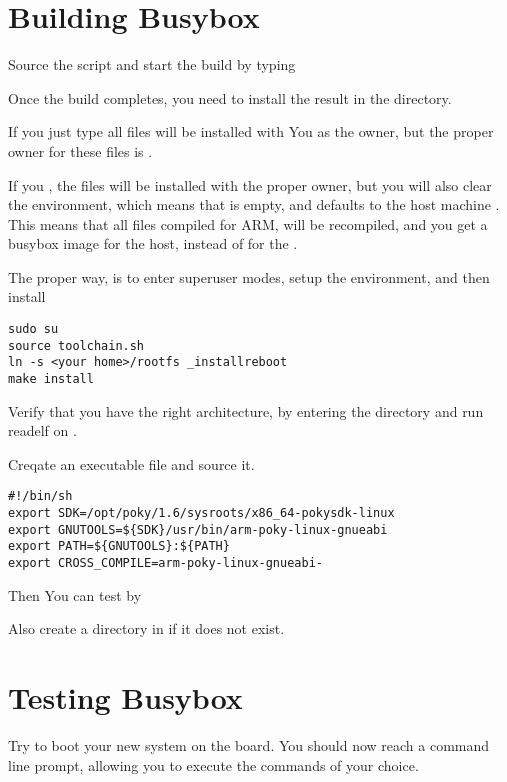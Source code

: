 \section{Building Busybox}

Source the  script and start the build by typing 

Once the build completes, you need to install the result in the  directory.

If you just type  all files will be installed with You as the owner,
but the proper owner for these files is .

If you , the files will be installed with the proper owner,
but you will also clear the environment, which means that  is empty,
and defaults to the host machine . This means that all files compiled for ARM, 
will be recompiled, and you get a busybox image for the host, instead of for the \devboard.

The proper way, is to enter superuser modes, setup the environment, and then install

\begin{verbatim}
sudo su
source toolchain.sh
ln -s <your home>/rootfs _installreboot
make install
\end{verbatim}

Verify that you have the right architecture, by entering the 
directory and run readelf on .

Creqate an executable file and source it.

\begin{verbatim}
#!/bin/sh
export SDK=/opt/poky/1.6/sysroots/x86_64-pokysdk-linux
export GNUTOOLS=${SDK}/usr/bin/arm-poky-linux-gnueabi
export PATH=${GNUTOOLS}:${PATH}
export CROSS_COMPILE=arm-poky-linux-gnueabi-
\end{verbatim}

Then You can test by 

Also create a  directory in  if it does not exist.

\section{Testing Busybox}

Try to boot your new system on the board. You should now reach a 
command line prompt, allowing you to execute the commands of your
choice.

